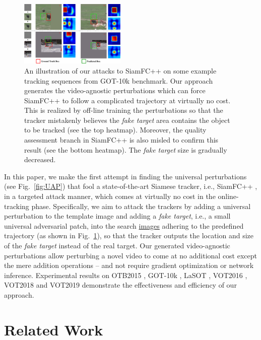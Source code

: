 \documentclass[journal]{IEEEtran}
\newcommand{\ie}{i.e.}
\begin{document}
\begin{figure}[t]
  \centering
  \includegraphics[width=0.45\textwidth]{images_imperceptible/1_v8.pdf}
  \caption{An illustration of our attacks to SiamFC++ on some example tracking sequences from GOT-10k benchmark. Our approach generates the video-agnostic perturbations which can force SiamFC++ to follow a complicated trajectory at virtually no cost. This is realized by off-line training the perturbations so that the tracker mistakenly believes the \textit{fake target} area contains the object to be tracked (see the top heatmap). Moreover, the quality assessment branch in SiamFC++ is also misled to confirm this result (see the bottom heatmap). The \textit{fake target} size is gradually decreased.} 
  \label{fig:1}
  \vspace{-5mm}
\end{figure}
  
In this paper, we make the first attempt in finding the universal perturbations (see Fig.~\ref{fig:UAP}) that fool a state-of-the-art Siamese tracker, \ie, SiamFC++ \cite{SiamFC++}, in a targeted attack manner, which comes at virtually no cost in the online-tracking phase. Specifically, we aim to attack the trackers by adding a universal perturbation to the template image and adding a \textit{fake target}, \ie, a small universal adversarial patch, into the search \uline{images} adhering to the predefined trajectory (as shown in Fig.~\ref{fig:1}), so that the tracker outputs the location and size of the \textit{fake target} instead of the real target. Our generated video-agnostic perturbations allow perturbing a novel video to come at no additional cost except the mere addition operations -- and not require gradient optimization or network inference. Experimental results on OTB2015 \cite{OTB}, GOT-10k \cite{GOT-10k}, LaSOT \cite{LaSOT}, VOT2016 \cite{VOT2016}, VOT2018 \cite{VOT2018} and VOT2019 \cite{VOT2019} demonstrate the effectiveness and efficiency of our approach.

\section{Related Work}
\end{document}
